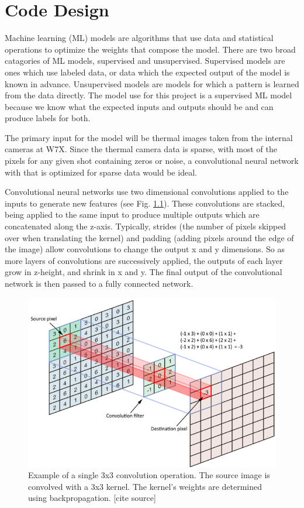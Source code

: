 %
\chapter{Code Design}
\label{sec:code:model}

Machine learning (ML) models are algorithms that use data and statistical operations to optimize the weights that compose the model.
There are two broad catagories of ML models, supervised and unsupervised.
Supervised models are ones which use labeled data, or data which the expected output of the model is known in advance.
Unsupervised models are models for which a pattern is learned from the data directly.
The model use for this project is a supervised ML model because we know what the expected inputs and outputs should be and can produce labels for both.

The primary input for the model will be thermal images taken from the internal cameras at W7X.
Since the thermal camera data is sparse, with most of the pixels for any given shot containing zeros or noise, a convolutional neural network with that is optimized for sparse data would be ideal.



Convolutional neural networks use two dimensional convolutions applied to the inputs to generate new features (see Fig. \ref{fig:code:2DConv}).
These convolutions are stacked, being applied to the same input to produce multiple outputs which are concatenated along the z-axis.
Typically, strides (the number of pixels skipped over when translating the kernel) and padding (adding pixels around the edge of the image) allow convolutions to change the output x and y dimensions.
So as more layers of convolutions are successively applied, the outputs of each layer grow in z-height, and shrink in x and y.
The final output of the convolutional network is then passed to a fully connected network.


\begin{figure}[htb]
    \includegraphics[width=\textwidth]{images/2d-Conv.png}
    \caption{Example of a single 3x3 convolution operation. The source image is convolved with a 3x3 kernel. The kernel's weights are determined using backpropagation. [cite source]}
    \label{fig:code:2DConv}
\end{figure}



